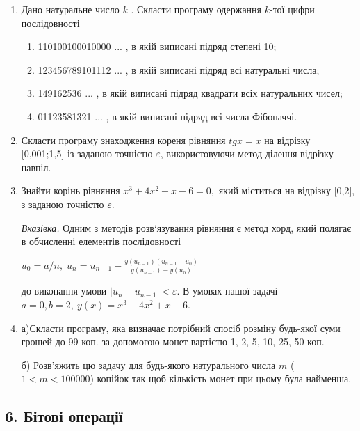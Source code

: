\documentclass[]{article}
\makeatletter
\newcommand{\xslalph}[1]{\expandafter\@xslalph\csname c@#1\endcsname}
\newcommand{\@xslalph}[1]{%
    \ifcase#1\or а\or б\or в\or г\or д\or e\or є\or ж\or з\or i%
    \or й\or к\or л\or м\or н\or о\or п\or р\or с\or т%
    \or у\or ф\or х\or ц\or ч\or ш\or ю\or я\or аа\or бб\or вв%
    \else\@ctrerr\fi%
}
\makeatother
\begin{document}
\begin{enumerate}
\def\labelenumi{\arabic{enumi})}
\setcounter{enumi}{16}
\item
  Дано натуральне число $k$ . Скласти програму одержання $k$-тої цифри послідовності
\begin{enumerate}[label=\xslalph*)]
\item 110100100010000 ... , в якій виписані підряд степені 10;
\item 123456789101112 ... , в якій виписані підряд всі натуральні числа;
\item 149162536 ... , в якій виписані підряд квадрати всіх натуральних
чисел;
\item 01123581321 ... , в якій виписані підряд всі числа Фібоначчі.

\end{enumerate}

\item
  Скласти програму знаходження кореня рівняння \(tgx = x\) на відрізку
  {[}0,001;1,5{]} із заданою точністю \(\varepsilon\), використовуючи
  метод ділення відрізку навпіл.
\item
  Знайти корінь рівняння \(x^{3} + 4x^{2} + x - 6 = 0,\) який міститься
  на відрізку {[}0,2{]}, з заданою точністю \(\varepsilon\).

\emph{\emph{Вказівка.}} Одним з методів розв`язування рівняння є метод
хорд, який полягає в обчисленні елементів послідовності 

\(u_{0} = a / n, \;  u_{n} = u_{n-1} - \frac{y(u_{n-1}) (u_{n-1} -u_{0})}{y(u_{n-1}) -y(u_{0})} \) 

до виконання умови \(\left| u_{n} - u_{n - 1} \right| < \varepsilon\). В
умовах нашої задачі \(a = 0,b = 2,\ y(x) = x^{3} + 4x^{2} + x - 6.\)

\item
  а)Скласти програму, яка визначає потрібний спосіб розміну будь-якої
  суми грошей до 99 коп. за допомогою монет вартістю 1, 2, 5, 10, 25, 50
  коп.

  б) Розв'яжить цю задачу для будь-якого натурального числа $m$
($1 <m<100000$) копійок так щоб кількість монет при
цьому була найменша.
\end{enumerate}


\newpage
\subsection{ 6. Бітові операції }
\setcounter{subsection}{1}
\end{document}
